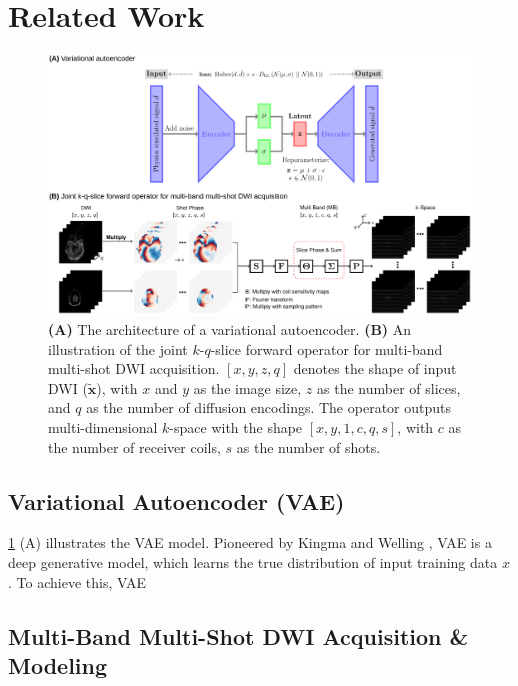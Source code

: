 \documentclass[journal,twoside,web]{ieeecolor}
\begin{document}
	\section{Related Work}

    \begin{figure}
		\centering
		\includegraphics[width=\textwidth]{../figures/fig1.png}
		\caption{\textbf{(A)} The architecture of a variational autoencoder.
            \textbf{(B)} An illustration of the joint $k$-$q$-slice forward operator
            for multi-band multi-shot DWI acquisition.
            $[x, y, z, q]$ denotes the shape of input DWI ($\mathbf{\tilde{x}}$),
            with $x$ and $y$ as the image size, $z$ as the number of slices,
            and $q$ as the number of diffusion encodings.
            The operator outputs multi-dimensional $k$-space with the shape $[x, y, 1, c, q, s]$,
            with $c$ as the number of receiver coils, $s$ as the number of shots.}
		\label{FIG:MODEL}
	\end{figure}

    \subsection{Variational Autoencoder (VAE)}

    \cref{FIG:MODEL} (A) illustrates the VAE model.
    Pioneered by Kingma and Welling \cite{kingma_2014_vae},
    VAE is a deep generative model,
    which learns the true distribution of input training data $x$.
    To achieve this, VAE

    \subsection{Multi-Band Multi-Shot DWI Acquisition \& Modeling}
\end{document}
